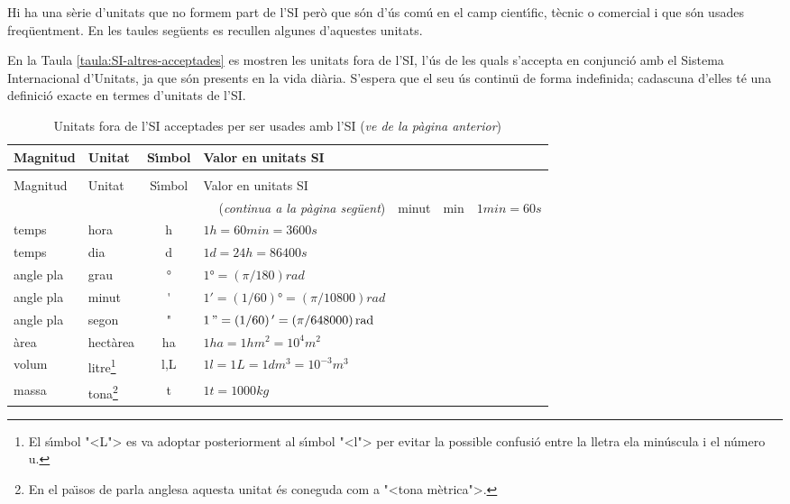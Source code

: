 Hi ha una s\`{e}rie d'unitats que no formem part de l'SI per\`{o} que s\'{o}n d'\'{u}s com\'{u} en el camp cient\'{\i}fic, t\`{e}cnic o comercial i que s\'{o}n usades freq\"{u}entment. En les taules seg\"{u}ents es recullen algunes d'aquestes unitats.

En la Taula \vref{taula:SI-altres-acceptades} es mostren les unitats fora de l'SI, l'\'{u}s de les quals s'accepta en conjunci\'{o} amb el Sistema Internacional d'Unitats, ja que s\'{o}n presents en la vida di\`{a}ria. S'espera que el seu \'{u}s continu\"{\i} de forma indefinida; cadascuna d'elles t\'{e} una definici\'{o} exacte en termes d'unitats de l'SI.

\begin{longtable}[h]{llcl}
   \caption{\label{taula:SI-altres-acceptades} Unitats fora de l'SI acceptades per ser usades amb l'SI  }\\
   \toprule[1pt]
    Magnitud & Unitat &  S\'{\i}mbol & Valor en unitats SI\\
   \midrule
   \endfirsthead
   \caption[]{Unitats fora de l'SI acceptades per ser usades amb l'SI (\emph{ve de la p\`{a}gina
   anterior})}\\
   \toprule[1pt]
    Magnitud & Unitat &  S\'{\i}mbol & Valor en unitats SI\\
   \midrule
   \endhead
   \midrule
   \multicolumn{4}{r}{(\emph{continua a la p\`{a}gina seg\"{u}ent})}
   \endfoot
   \endlastfoot
   temps & minut &  \unit{min}& $1\unit{min} = 60\unit{s}$ \\
   temps & hora & \unit{h} & $1\unit{h} = 60\unit{min} = 3600\unit{s}$ \\
   temps & dia & \unit{d} & $1\unit{d} = 24\unit{h} = 86400\unit{s}$\\
   angle pla & grau &  \unit{\degree} &   $1\unit{\degree} = (\pi/180)\unit{rad}$ \\
   angle pla & minut & \unit{'} & $1\unit{'} = (1/60)\unit{\degree} = (\pi/10800)\unit{rad}$ \\
   angle pla & segon & \unit{"} & $1\mathrm{\,"} = (1/60)\mathrm{\,'} = (\pi/648000)\mathrm{\,rad}$ \\
   \`{a}rea & hect\`{a}rea & \unit{ha} & $1\unit{ha} = 1\unit{hm^2} = 10^4\unit{m^2}$\\
   volum & litre\footnote{El s\'{\i}mbol {"<}L{">} es va adoptar posteriorment al s\'{\i}mbol {"<}l{">} per evitar la possible confusi\'{o} entre la lletra ela min\'{u}scula i  el n\'{u}mero u.}& \unit{l},\unit{L} & $1\unit{l} = 1\unit{L} = 1\unit{dm^3} = 10^{-3}\unit{m^3}$ \\
   massa & tona\footnote{En el pa\"{\i}sos de parla anglesa aquesta unitat \'{e}s coneguda com a {"<}tona m\`{e}trica{">}.} & \unit{t} & $1\unit{t} =1000\unit{kg}$\\
   \bottomrule[1pt]
\end{longtable}
\index{$\degree$}

